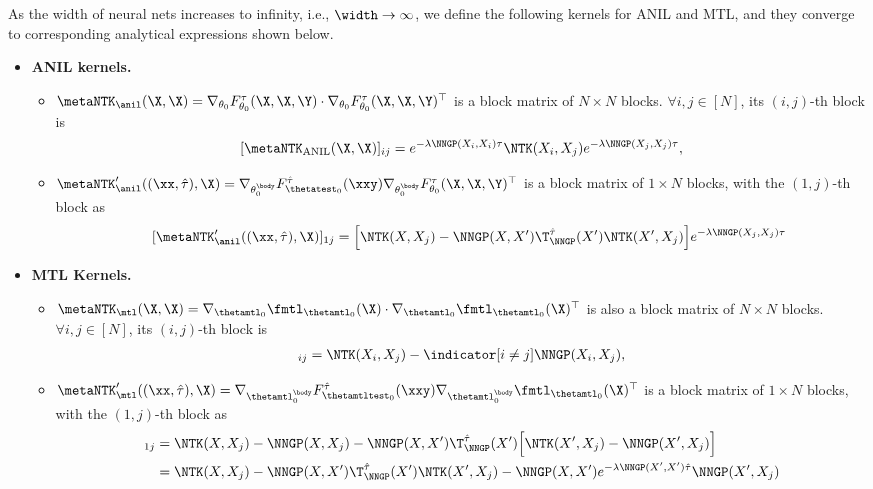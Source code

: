 \documentclass{article}
\begin{document}
\begin{lemma}\label{lemma:anil-mtl-kernels} As the width of neural nets increases to infinity, i.e., $\width \rightarrow \infty$, we define the following kernels for ANIL and MTL, and they converge to corresponding analytical expressions shown below.
\begin{itemize}
    \item \textbf{ANIL kernels.} 
    \begin{itemize}
        \item $\metaNTK_\anil(\X,\X) = \nabla_{\theta_0} F^\tau_{\theta_0}(\X,\X,\Y) \cdot  \nabla_{\theta_0} F^\tau_{\theta_0}(\X,\X,\Y)^\top$ is a block matrix of $N\times N$ blocks. $\forall i,j\in[N]$, its $(i,j)$-th block is
    \begin{align}
        &\quad [\metaNTK_\mathrm{ANIL}(\X,\X)]_{ij} = e^{-\lambda \NNGP(X_i,X_i)\tau} \NTK(X_i,X_j) e^{-\lambda \NNGP(X_j,X_j)\tau},\nonumber
\end{align}
        \item $\metaNTK_\anil'((\xx,\hat\tau),\X)=\nabla_{\theta_0^\body} F^{\hat \tau}_{\thetatest_0} (\xxy) \nabla_{\theta_0^\body} F^{\tau}_{\theta_0} (\X,\X,\Y)^\top $ is a block matrix of $1 \times N$ blocks, with the $(1,j)$-th block as 
    \begin{align}
        &\qquad [\metaNTK_\anil'((\xx,\hat\tau),\X)]_{1j} =
         \Big[\NTK(X,X_j) - \NNGP(X,X') \T_{\NNGP}^{\hat\tau}(X') \NTK(X',X_j)\Big]e^{-\lambda \NNGP(X_j,X_j) \tau} \nonumber
    \end{align}
    \end{itemize}
    \item \textbf{MTL Kernels.} 
    \begin{itemize}
        \item $\metaNTK_\mtl(\X,\X)=\nabla_{\thetamtl_0} \fmtl_{\thetamtl_0}(\X) \cdot  \nabla_{\thetamtl_0} \fmtl_{\thetamtl_0}(\X)^\top$ is also a block matrix of $N\times N$ blocks. $\forall i,j\in[N]$, its $(i,j)$-th block is
    \begin{align}
        [\metaNTK_\mtl(\X,\X)]_{ij} = \NTK (X_i,X_j) - \indicator [i\neq j] \NNGP(X_i,X_j), \nonumber
    \end{align}
        \item $\metaNTK_\mtl'((\xx,\hat\tau),\X)=\nabla_{\thetamtl_0^\body} F^{\hat \tau}_{\thetamtltest_0} (\xxy) \nabla_{\thetamtl_0^\body} \fmtl_{\thetamtl_0}(\X)^\top$ is a block matrix of $1 \times N$ blocks, with the $(1,j)$-th block as
    \begin{align}
        [\metaNTK_\mtl'((X,X',\hat\tau),\X)]_{1j} &=
        \NTK(X,X_j) - \NNGP(X,X_j)
         - \NNGP(X,X')\T_{\NNGP}^{\hat\tau}(X') \Big[\NTK(X',X_j) - \NNGP(X',X_j)\Big] \\
        &=\NTK(X,X_j) - \NNGP(X,X') \T_{\NNGP}^{\hat\tau}(X') \NTK(X',X_j) 
        - \NNGP(X,X')e^{-\lambda \NNGP(X',X') \hat \tau}\NNGP(X',X_j)\nonumber
\end{align}
    \end{itemize}    
\end{itemize}
\end{lemma}
\end{document}
